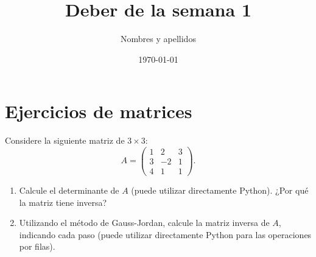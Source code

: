 \documentclass[11pt]{article}
\title{Deber de la semana 1}
\author{Nombres y apellidos}
\affil{Carrera de Ciencia de Datos}
\date{\today}
\begin{document}
\maketitle

\section{Ejercicios de matrices}


\begin{ejer}
    Considere la siguiente matriz de $3\times 3$:
    \[
        A = \begin{pmatrix}
            1 & 2 & 3 \\
            3 &-2 & 1 \\
            4 & 1 & 1
        \end{pmatrix}.
    \]
    \begin{enumerate}[leftmargin=*,label=\textit{\alph*})]
        \item
            Calcule el determinante de $A$ (puede utilizar directamente Python). ¿Por qué la matriz tiene inversa? 
        \item
            Utilizando el método de Gauss-Jordan, calcule la matriz inversa de $A$, indicando cada paso (puede utilizar directamente Python para las operaciones por filas).
    \end{enumerate}
\end{ejer}
\end{document}
